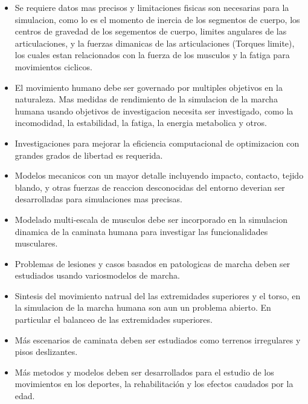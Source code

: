 \documentclass[10pt,onecolumn,twoside,letterpaper]{article}
\begin{document}
\begin{itemize}
\item Se requiere datos mas precisos y limitaciones fisicas son necesarias para la simulacion, como lo es el momento de inercia de los segmentos de cuerpo, los centros de gravedad de los segementos de cuerpo, limites angulares de las articulaciones, y la fuerzas dimanicas de las articulaciones (Torques limite), los cuales estan relacionados con la fuerza de los musculos y la fatiga para movimientos ciclicos.
\item El movimiento humano debe ser governado por multiples objetivos en la naturaleza. Mas medidas de rendimiento de la simulacion de la marcha humana usando objetivos de investigacion necesita ser investigado, como la incomodidad, la estabilidad, la fatiga, la energia metabolica y otros.
\item Investigaciones para mejorar la eficiencia computacional de optimizacion con grandes grados de libertad es requerida.
\item Modelos mecanicos con un mayor detalle incluyendo impacto, contacto, tejido blando, y otras fuerzas de reaccion desconocidas del entorno  deverian ser desarrolladas para simulaciones mas precisas.
\item Modelado multi-escala de musculos debe ser incorporado en la simulacion dinamica de la caminata humana para investigar las funcionalidades musculares.
\item Problemas de lesiones y casos basados en patologicas de marcha deben ser estudiados usando variosmodelos de marcha.
\item Sintesis del movimiento natrual del las extremidades superiores y el torso, en la simulacion de la marcha humana son aun un problema abierto. En particular el balanceo de las extremidades superiores.
\item M\'as escenarios de caminata deben ser estudiados como terrenos irregulares y pisos deslizantes.
\item M\'as metodos y modelos deben ser desarrollados para el estudio de los movimientos en los deportes, la rehabilitaci\'on y los efectos caudados por la edad.
\end{itemize}
\end{document}

